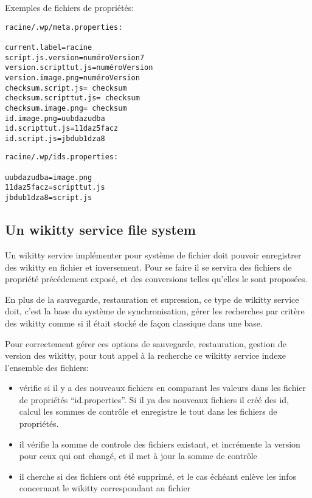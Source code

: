 Exemples de fichiers de propriétés:
\begin{verbatim}
racine/.wp/meta.properties:

current.label=racine
script.js.version=numéroVersion7
version.scripttut.js=numéroVersion
version.image.png=numéroVersion
checksum.script.js= checksum
checksum.scripttut.js= checksum
checksum.image.png= checksum
id.image.png=uubdazudba
id.scripttut.js=11daz5facz
id.script.js=jbdub1dza8
\end{verbatim}

\begin{verbatim}
racine/.wp/ids.properties:

uubdazudba=image.png
11daz5facz=scripttut.js
jbdub1dza8=script.js
\end{verbatim}

\subsection{Un wikitty service file system}

Un wikitty service implémenter pour système de fichier doit pouvoir enregistrer
des wikitty en fichier et inversement. Pour se faire il se servira des fichiers
de propriété précédement exposé, et des conversions telles qu'elles le sont
proposées.

En plus de la sauvegarde, restauration et supression, ce type de wikitty service
doit, c'est la base du système de synchronisation, gérer les recherches par
critère des wikitty comme si il était stocké de façon classique dans une base.

Pour correctement gérer ces options de sauvegarde, restauration, gestion de
version des wikitty, pour tout appel à la recherche ce wikitty service indexe
l'ensemble des fichiers:
\begin{itemize}
\item vérifie si il y a des nouveaux fichiers en comparant les valeurs dans les
fichier de propriétés ``id.properties''. Si il ya des nouveaux fichiers il créé
des id, calcul les sommes de contrôle et enregistre le tout dans les fichiers de
propriétés.
\item il vérifie la somme de controle des fichiers existant, et incrémente la
version pour ceux qui ont changé, et il met à jour la somme de contrôle
\item il cherche si des fichiers ont été supprimé, et le cas échéant enlève les
infos concernant le wikitty correspondant au fichier
\end{itemize}

